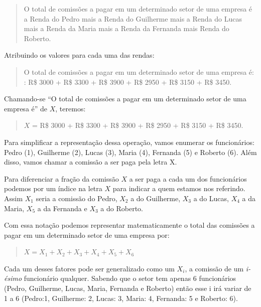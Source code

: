 \documentclass[
]{book}
\begin{document}
\hfill\break

\begin{quote}
O total de comissões a pagar em um determinado setor de uma empresa é a Renda do Pedro mais a Renda do Guilherme mais a Renda do Lucas mais a Renda da Maria mais a Renda da Fernanda mais Renda do Roberto.
\end{quote}

\hfill\break

Atribuindo os valores para cada uma das rendas:

\hfill\break

\begin{quote}
O total de comissões a pagar em um determinado setor de uma empresa é: : R\$ 3000 + R\$ 3300 + R\$ 3900 + R\$ 2950 + R\$ 3150 + R\$ 3450.
\end{quote}

\hfill\break

Chamando-se ``O total de comissões a pagar em um determinado setor de uma empresa é'' de \(X\), teremos:

\hfill\break

\begin{quote}
\(X\) = R\$ 3000 + R\$ 3300 + R\$ 3900 + R\$ 2950 + R\$ 3150 + R\$ 3450.
\end{quote}

\hfill\break

Para simplificar a representação dessa operação, vamos enumerar os funcionários: Pedro (1), Guilherme (2), Lucas (3), Maria (4), Fernanda (5) e Roberto (6). Além disso, vamos chamar a comissão a ser paga pela letra X.

Para diferenciar a fração da comissão \(X\) a ser paga a cada um dos funcionários podemos por um índice na letra \(X\) para indicar a quem estamos nos referindo. Assim \(X_{1}\) seria a comissão do Pedro, \(X_{2}\) a do Guilherme, \(X_{3}\) a do Lucas, \(X_{4}\) a da Maria, \(X_{5}\) a da Fernanda e \(X_{3}\) a do Roberto.

Com essa notação podemos representar matematicamente o total das comissões a pagar em um determinado setor de uma empresa por:

\begin{quote}
\(X=X_{1}+X_{2}+X_{3}+X_{4}+X_{5}+X_{6}\)
\end{quote}

Cada um desses fatores pode ser generalizado como um \(X_{i}\), a comissão de um \emph{i-ésimo} funcionário qualquer. Sabendo que o setor tem apenas 6 funcionários (Pedro, Guilherme, Lucas, Maria, Fernanda e Roberto) então esse i irá variar de 1 a 6 (Pedro:1, Guilherme: 2, Lucas: 3, Maria: 4, Fernanda: 5 e Roberto: 6).
\end{document}
